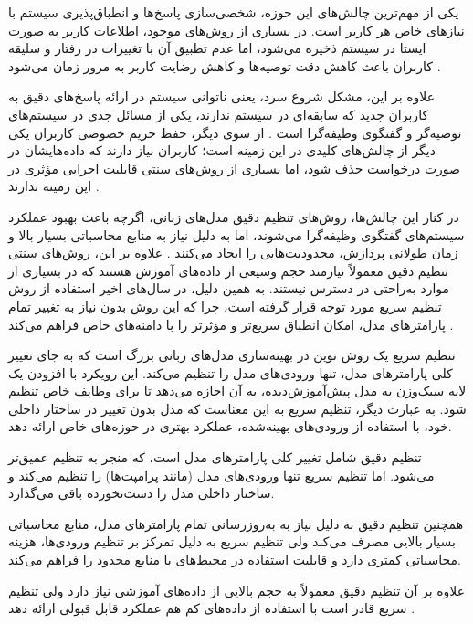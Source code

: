 یکی از مهم‌ترین چالش‌های این حوزه، شخصی‌سازی پاسخ‌ها و انطباق‌پذیری سیستم با نیازهای خاص هر کاربر است. در بسیاری از روش‌های موجود، اطلاعات کاربر به صورت ایستا در سیستم ذخیره می‌شود، اما عدم تطبیق آن با تغییرات در رفتار و سلیقه کاربران باعث کاهش دقت توصیه‌ها و کاهش رضایت کاربر به مرور زمان می‌شود 
\cite{azzam2022model}. 

علاوه بر این، مشکل شروع سرد، یعنی ناتوانی سیستم در ارائه پاسخ‌های دقیق به کاربران جدید که سابقه‌ای در سیستم ندارند، یکی از مسائل جدی در سیستم‌های توصیه‌گر و گفتگوی وظیفه‌گرا است
 \cite{yuan2023user}. 
از سوی دیگر، حفظ حریم خصوصی کاربران یکی دیگر از چالش‌های کلیدی در این زمینه است؛ کاربران نیاز دارند که داده‌هایشان در صورت درخواست حذف شود، اما بسیاری از روش‌های سنتی قابلیت اجرایی مؤثری در این زمینه ندارند
 \cite{zhang2024right}.

در کنار این چالش‌ها، روش‌های تنظیم دقیق مدل‌های زبانی، اگرچه باعث بهبود عملکرد سیستم‌های گفتگوی وظیفه‌گرا می‌شوند، اما به دلیل نیاز به منابع محاسباتی بسیار بالا و زمان طولانی پردازش، محدودیت‌هایی را ایجاد می‌کنند 
\cite{kasahara2022building}. 
علاوه بر این، روش‌های سنتی تنظیم دقیق معمولاً نیازمند حجم وسیعی از داده‌های آموزش هستند که در بسیاری از موارد به‌راحتی در دسترس نیستند. به همین دلیل، در سال‌های اخیر استفاده از روش تنظیم سریع%
 مورد توجه قرار گرفته است، چرا که این روش بدون نیاز به تغییر تمام پارامترهای مدل، امکان انطباق سریع‌تر و مؤثرتر را با دامنه‌های خاص فراهم می‌کند 
\cite{madotto2021few}.

تنظیم سریع یک روش نوین در بهینه‌سازی مدل‌های زبانی بزرگ است که به جای تغییر کلی پارامترهای مدل، تنها ورودی‌های مدل را تنظیم می‌کند. این رویکرد با افزودن یک لایه سبک‌وزن به مدل پیش‌آموزش‌دیده، به آن اجازه می‌دهد تا برای وظایف خاص تنظیم شود. به عبارت دیگر، تنظیم سریع به این معناست که مدل بدون تغییر در ساختار داخلی خود، با استفاده از ورودی‌های بهینه‌شده، عملکرد بهتری در حوزه‌های خاص ارائه دهد.

تنظیم دقیق شامل تغییر کلی پارامترهای مدل است، که منجر به تنظیم عمیق‌تر می‌شود. اما تنظیم سریع تنها ورودی‌های مدل (مانند پرامپت‌ها) را تنظیم می‌کند و ساختار داخلی مدل را دست‌نخورده باقی می‌گذارد. 

همچنین تنظیم دقیق به دلیل نیاز به به‌روزرسانی تمام پارامترهای مدل، منابع محاسباتی بسیار بالایی مصرف می‌کند ولی تنظیم سریع به دلیل تمرکز بر تنظیم ورودی‌ها، هزینه محاسباتی کمتری دارد و قابلیت استفاده در محیط‌های با منابع محدود را فراهم می‌کند.

علاوه بر آن تنظیم دقیق معمولاً به حجم بالایی از داده‌های آموزشی نیاز دارد ولی تنظیم سریع قادر است با استفاده از داده‌های کم هم عملکرد قابل قبولی ارائه دهد%
\cite{wang2022no}.

